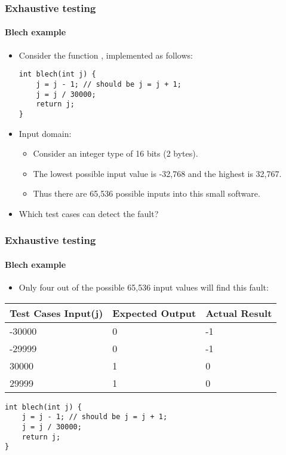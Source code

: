 \begin{frame}[hasprev=false, hasnext=true, fragile]
\label{example:blech-exhaustive-testing}
\frametitle{Exhaustive testing}
\framesubtitle{Blech example}

\begin{block:ie}{}
\begin{itemize}
	\item Consider the function , implemented as follows:
\begin{lstlisting}
int blech(int j) {
    j = j - 1; // should be j = j + 1;
    j = j / 30000;
    return j;
}
\end{lstlisting}

	\item Input domain:
	\begin{itemize}
		\item Consider an integer type of 16 bits (2 bytes).

		\item The lowest possible input value is -32,768 and the highest is
		32,767.

		\item Thus there are 65,536 possible inputs into this small software.
	\end{itemize}

	\item Which test cases can detect the fault?
\end{itemize}
\end{block:ie}
\end{frame}



\begin{frame}[hasprev=true, hasnext=false, fragile]
\frametitle{Exhaustive testing}
\framesubtitle{Blech example}

\begin{block:ie}{}
\begin{itemize}
	\item Only four out of the possible 65,536 input values will find this
	fault:
\end{itemize}

{
	\centering
	\small
    \begin{tabular}{|l|l|l|}
	\hline
	Test Cases Input(j)	& Expected Output	& Actual Result \\
	\hline
	-30000 & 0 & -1\\
	\hline
	-29999 & 0 & -1\\
	\hline
	30000 & 1 & 0\\
	\hline
	29999 & 1 & 0\\
	\hline
    \end{tabular}
}

\begin{lstlisting}
int blech(int j) {
    j = j - 1; // should be j = j + 1;
    j = j / 30000;
    return j;
}
\end{lstlisting}
\end{block:ie}
\end{frame}

